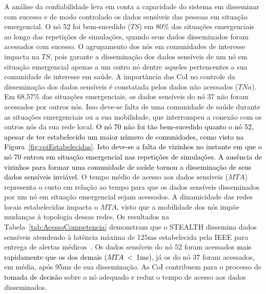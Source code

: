 \documentclass[12pt]{article}
\newcommand{\rev}[1]{\textcolor{black}{{#1}}}
\begin{document}

A análise da confiabilidade 
leva em conta
a capacidade do sistema em disseminar com sucesso e de modo controlado os dados sensíveis das pessoas em situação emergencial.
O nó 52 foi bem-sucedido ($TS$) em 80\% das situações emergenciais ao longo das repetições de simulações, quando seus dados disseminados foram acessados com sucesso. O agrupamento dos nós em comunidades de interesse impacta
na $TS$, pois garante a disseminação dos dados sensíveis de um nó em situação emergencial apenas a um outro nó dentre aqueles
pertencentes a sua comunidade de interesse em saúde. A importância das CoI no controle da
disseminação dos dados sensíveis
é constatada pelos dados não acessados ($TNa$). Em 68,57\% das situações emergenciais, os dados sensíveis do nó 37 não foram acessados por outros nós. 
Isso deve-se
falta de uma comunidade de saúde durante as situações emergenciais ou 
a sua mobilidade, que interrompeu a conexão com os outros nós da sua rede local.
\rev{O nó 70 não foi tão bem-sucedido quanto o nó 52, apesar de ter estabelecido um maior número de comunidades, como 
visto na Figura~\ref{fig:coiEstabelecidas}.
Isto deve-se 
a falta  de vizinhos
no instante em que o nó 70 entrou em situação emergencial nas repetições de simulações.
A ausência de 
vizinhos para formar uma comunidade de saúde  %
tornou a disseminação de seus dados sensíveis inviável.} 
%
O tempo médio de acesso aos dados sensíveis (\textbf{$MTA$}) representa o custo em relação ao tempo para que os dados sensíveis disseminados por um nó em situação emergencial sejam acessados.
A
dinamicidade das redes locais estabelecidas
impacta o \textbf{$MTA$}, visto que
a mobilidade dos nós impõe mudanças à
topologia dessas redes.
Os resultados 
na
Tabela~\ref{tab:AcessoCompetencia} demonstram que o STEALTH dissemina dados sensíveis
atendendo à latência máxima de 125ms estabelecida pela IEEE para entrega de alertas médicos~\cite{ieee2012}. Os dados sensíveis do nó 52 foram acessados
\rev{mais rapidamente que os dos demais
($MTA$~<~1ms)}, já os do nó 37 foram acessados, em média, após 95ms de sua disseminação. As CoI  contribuem para o processo de \rev{tomada de decisão} sobre o nó adequado e reduz o tempo de acesso aos dados disseminados.
\end{document}
